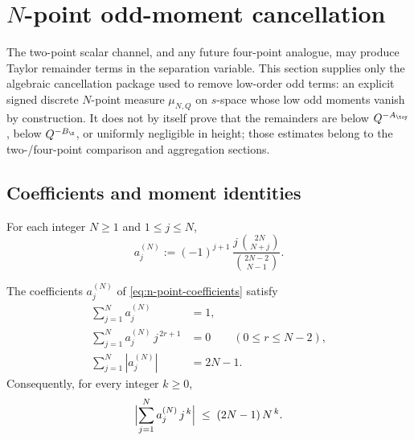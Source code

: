 \section{\texorpdfstring{\(N\)}{N}-point odd-moment cancellation}
\label{sec:n-point-odd-moment-cancellation}
\quad
{}\quad
{}\quad
{}\quad
{}\quad
{}
\par\medskip

The two-point scalar channel, and any future four-point analogue, may
produce Taylor remainder terms in the separation variable.  This section
supplies only the algebraic cancellation package used to remove low-order
odd terms: an explicit signed discrete \(N\)-point measure
\(\mu_{N,Q}\) on \(s\)-space whose low odd moments vanish by
construction.  It does not by itself prove that the remainders are below
\(Q^{-A_\toy}\), below \(Q^{-B_\z}\), or uniformly negligible in height;
those estimates belong to the two-/four-point comparison and aggregation
sections.

\subsection{Coefficients and moment identities}
\label{subsec:n-point-coefficients}

\begin{definition}
\label{def:n-point-coefficients}
For each integer \(N\ge 1\) and \(1\le j\le N\),
\begin{equation}
\label{eq:n-point-coefficients}
        a_j^{(N)}
        :=
        (-1)^{j+1}\,
        \frac{j\,\binom{2N}{N+j}}{\binom{2N-2}{N-1}}.
\end{equation}
\end{definition}

\begin{lemma}
\label{lem:n-point-coefficients}
The coefficients \(a_j^{(N)}\) of \eqref{eq:n-point-coefficients} satisfy
\begin{align}
\label{eq:n-point-normalization}
        \sum_{j=1}^N a_j^{(N)}
        &= 1,\\
\label{eq:n-point-odd-moments-vanish}
        \sum_{j=1}^N a_j^{(N)}\, j^{\,2r+1}
        &= 0
        \qquad (0\le r\le N-2),\\
\label{eq:n-point-ell1}
        \sum_{j=1}^N |a_j^{(N)}|
        &= 2N - 1.
\end{align}
Consequently, for every integer \(k\ge 0\),
\begin{equation}
\label{eq:n-point-moment-bound}
        \Bigl|\sum_{j=1}^N a_j^{(N)}\, j^{\,k}\Bigr|
        \;\le\;
        (2N-1)\,N^{\,k}.
\end{equation}
\end{lemma}

